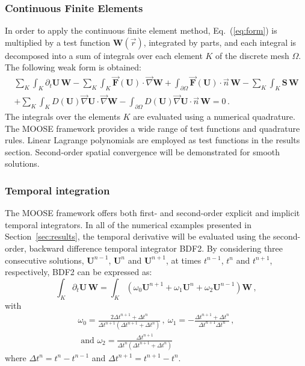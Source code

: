 \documentclass[review,10pt]{elsarticle}
\newcommand{\grad}{\vec{\nabla}}
\newcommand{\eqt}[1]{Eq.~(\ref{#1})}                     %
\newcommand{\sct}[1]{Section~\ref{#1}}                   %
\begin{document}
\subsubsection{Continuous Finite Elements} 
In order to apply the continuous finite element method, \eqt{eq:form} is multiplied by a test function 
$\mathbf W(\vec{r})$, integrated by parts, and each integral is decomposed into a sum of integrals over 
each element $K$ of the discrete mesh $\Omega$. The following weak form is obtained:
\begin{multline}\label{eq:cfem}
\sum_K \int_{K} \partial_t \mathbf U \, \mathbf W - \sum_K \int_{K} \vec{\mathbf F}(\mathbf U) \cdot \grad \mathbf W + \int_{\partial \Omega} \vec{\mathbf F}(\mathbf U) \cdot \vec{n} \, \mathbf W - \sum_K \int_{K} \mathbf S \, \mathbf W  \\
+ \sum_K \int_{K} D(\mathbf U) \grad \mathbf U \cdot \grad \mathbf W 
- \int_{\partial \Omega} D(\mathbf U) \grad \mathbf U \cdot \vec{n} \, \mathbf W = 0 \,.
\end{multline}
The integrals over the elements $K$ are evaluated using a numerical quadrature. The MOOSE framework 
provides a wide range of test functions and quadrature rules. Linear Lagrange polynomials are employed 
as test functions in the results section. Second-order spatial convergence will be demonstrated for smooth solutions. 
%
\subsubsection{Temporal integration} 
The MOOSE framework offers both first- and second-order explicit and implicit temporal integrators. 
In all of the numerical examples presented in \sct{sec:results}, the temporal derivative  will be 
evaluated using the second-order, backward difference temporal integrator BDF2. By considering three 
consecutive solutions, $\mathbf U^{n-1}$, $\mathbf U^n$ and $\mathbf U^{n+1}$, at times $t^{n-1}$, $t^n$ and $t^{n+1}$, respectively, BDF2 can be expressed as:
\begin{equation}
\label{eq:BDF2}
\int_{K} \partial_t \mathbf U \, \mathbf  W = \int_{K} \left( \omega_0 \mathbf U^{n+1}  + \omega_1 \mathbf U^n + \omega_2 \mathbf U^{n-1} \right) \mathbf W \,,
\end{equation}
%
with
\begin{multline}
\omega_0 =\frac{2\Delta t^{n+1}+\Delta t^n}{\Delta t^{n+1} \left( \Delta t^{n+1}+\Delta t^n \right)} \, , \ 
\omega_1 = -\frac{\Delta t^{n+1}+\Delta t^n}{\Delta t^{n+1} \Delta t^n}  \, , \\
\text{ and } \omega_2 = \frac{\Delta t^{n+1}}{\Delta t^n \left( \Delta t^{n+1} + \Delta t^n \right)} \nonumber
\end{multline}
where $\Delta t^{n} = t^n-t^{n-1}$ and $\Delta t^{n+1} = t^{n+1}-t^{n}$.
\end{document}
